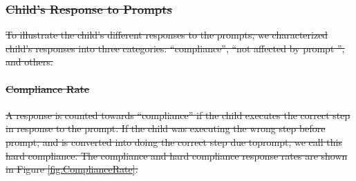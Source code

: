 \documentclass{ut-thesis}
\providecommand{\DIFdeltex}[1]{{\protect\color{red}\sout{#1}}}                      %
\providecommand{\DIFdel}[1]{\texorpdfstring{\DIFdeltex{#1}}{}} %
\begin{document}
\subsubsection{\DIFdel{Child's Response to Prompts}}
\addtocounter{subsubsection}{-1}%
\DIFdel{To illustrate the child's different responses to the prompts, we characterized child's responses into three categories: ``compliance'', ``not affected by prompt '', and others.
}%

\paragraph{\DIFdel{Compliance Rate}}
\addtocounter{paragraph}{-1}%
\DIFdel{A response is counted towards ``compliance'' if the child executes the correct step in response to the prompt.  If the child was executing the wrong step before prompt, and is converted into doing the correct step due toprompt, we call this hard compliance.  The compliance and hard compliance response rates are shown in Figure \ref{fig:ComplianceRate}.
}%
\end{document}
